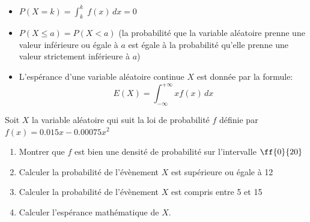 \begin{propriete}{}
\begin{itemize}
	\item $P(X=k)=\displaystyle\int_k^k\;f(x)\,dx=0$ 
	\item $P(X \leq a) = P(X < a)$ (la probabilité que la variable aléatoire prenne une valeur inférieure ou égale à $a$ est égale à la probabilité qu'elle prenne une valeur strictement inférieure à $a$)
	\item L'espérance d'une variable aléatoire continue $X$ est donnée par la formule: \[E(X) = \displaystyle\int_{-\infty}^{+\infty} x f(x) \, dx\]
\end{itemize}
\end{propriete}

\begin{exercice_cours}

Soit $X$ la variable aléatoire qui suit la loi de probabilité $f$ définie par $f(x)=0.015x-0.00075x^2$

\begin{enumerate}
	\item Montrer que $f$ est bien une densité de probabilité sur l'intervalle $\ff{0}{20}$
	
\begin{blocvisiblex}[height=2.]
{\quad}
\end{blocvisiblex}
	\item Calculer la probabilité de l'évènement \og $X$ est supérieure ou égale à 12 \fg{} 
	

\begin{blocvisiblex}[height=2.]
{\quad}
\end{blocvisiblex}	
	\item Calculer la probabilité de l'évènement \og $X$ est compris entre 5 et 15 \fg{} 
	

\begin{blocvisiblex}[height=2.]
{\quad}
\end{blocvisiblex}
\item Calculer l'espérance mathématique de $X$.


\begin{blocvisiblex}[height=2.]
{\quad}
\end{blocvisiblex}\end{enumerate}


\end{exercice_cours}